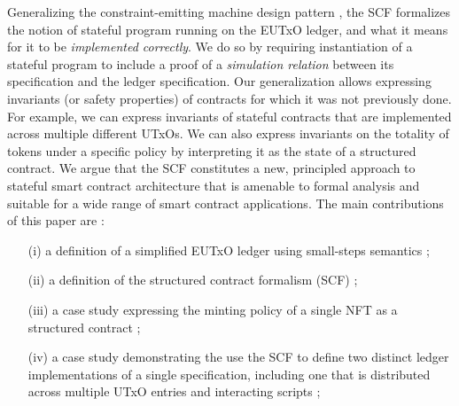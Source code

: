 Generalizing the constraint-emitting machine design pattern \cite{eutxoma},
the SCF formalizes the notion of stateful program running on the EUTxO ledger,
and what it means for it to be \emph{implemented correctly}. We do so by
requiring instantiation of a stateful program to include a proof of a \emph{simulation relation }
between its specification and the ledger specification.
Our generalization allows expressing invariants (or safety properties) of contracts
for which it was not previously done. For example, we can express invariants of stateful
contracts that are implemented across multiple different UTxOs. We can also
express invariants on the totality of tokens under a specific policy by interpreting
it as the state of a structured contract. %
We argue that the SCF constitutes a new, principled approach to stateful
smart contract architecture that is amenable to formal analysis and suitable for
a wide range of smart contract applications.
The main contributions of this paper are :

\begin{itemize}
  \item[(i)] a definition of a simplified EUTxO ledger using small-steps semantics ;

  \item[(ii)] a definition of the structured contract formalism (SCF) ;

  \item[(iii)] a case study expressing the
  minting policy of a single NFT as a structured contract ;

  \item[(iv)] a case study demonstrating the use the SCF to define
  two distinct ledger implementations of a
  single specification, including one that is distributed across multiple
  UTxO entries and interacting scripts ;

\end{itemize}
